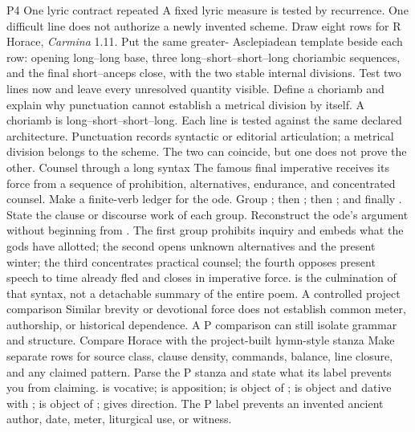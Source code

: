 \begin{courseunit}{P4}
\SubmoduleExtension
  {One lyric contract repeated}
  {A fixed lyric measure is tested by recurrence. One difficult line does not
  authorize a newly invented scheme.}
  {Draw eight rows for R Horace, \textit{Carmina} 1.11. Put the same greater-
  Asclepiadean template beside each row: opening long--long base, three
  long--short--short--long choriambic sequences, and the final
  short--anceps close, with the two stable internal divisions. Test two lines
  now and leave every unresolved quantity visible.}
  {Define a choriamb and explain why punctuation cannot establish a metrical
  division by itself.}
  {A choriamb is long--short--short--long. Each line is tested against the same
  declared architecture. Punctuation records syntactic or editorial
  articulation; a metrical division belongs to the scheme. The two can
  coincide, but one does not prove the other.}
\SubmoduleExtension
  {Counsel through a long syntax}
  {The famous final imperative receives its force from a sequence of
  prohibition, alternatives, endurance, and concentrated counsel.}
  {Make a finite-verb ledger for the ode. Group ; then ; then ; and finally . State the
  clause or discourse work of each group.}
  {Reconstruct the ode's argument without beginning from .}
  {The first group prohibits inquiry and embeds what the gods have allotted;
  the second opens unknown alternatives and the present winter; the third
  concentrates practical counsel; the fourth opposes present speech to time
  already fled and closes in imperative force.  is the
  culmination of that syntax, not a detachable summary of the entire poem.}
\SubmoduleExtension
  {A controlled project comparison}
  {Similar brevity or devotional force does not establish common meter,
  authorship, or historical dependence. A P comparison can still isolate
  grammar and structure.}
  {Compare Horace with the project-built hymn-style stanza  Make separate rows for source class, clause density, commands,
  balance, line closure, and any claimed pattern.}
  {Parse the P stanza and state what its label prevents you from claiming.}
  { is vocative;  is apposition;
   is object of ;  is
  object and  dative with ;  is object of
  ;  gives direction. The P label prevents an
  invented ancient author, date, meter, liturgical use, or witness.}
\end{courseunit}


